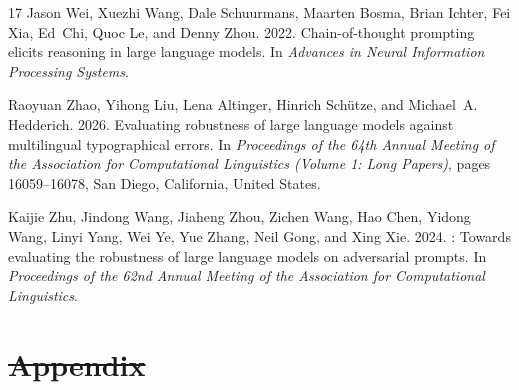 \documentclass[11pt]{article} %
\makeatletter
\providecommand{\DIFdel}[1]{{\protect\color{red}\sout{#1}}} %
\providecommand{\DIFaddbegin}{} %
\providecommand{\DIFaddend}{} %
\providecommand{\DIFdelbegin}{} %
\providecommand{\DIFdelend}{} %
\providecommand{\DIFscaledelfig}{0.5}
\newlength{\DIFdelgraphicswidth} %
\newlength{\DIFdelgraphicsheight} %
\providecommand{\DIFaddincludegraphics}[2][]{{\color{blue}\fbox{\DIFOincludegraphics[#1]{#2}}}} %
\providecommand{\DIFdelincludegraphics}[2][]{%
\sbox{\DIFdelgraphicsbox}{\DIFOincludegraphics[#1]{#2}}%
\settoboxwidth{\DIFdelgraphicswidth}{\DIFdelgraphicsbox} %
\settoboxtotalheight{\DIFdelgraphicsheight}{\DIFdelgraphicsbox} %
\scalebox{\DIFscaledelfig}{%
\parbox[b]{\DIFdelgraphicswidth}{\usebox{\DIFdelgraphicsbox}\\[-\baselineskip] \rule{\DIFdelgraphicswidth}{0em}}\llap{\resizebox{\DIFdelgraphicswidth}{\DIFdelgraphicsheight}{%
\setlength{\unitlength}{\DIFdelgraphicswidth}%
\begin{picture}(1,1)%
\thicklines\linethickness{2pt} %
{\color[rgb]{1,0,0}\put(0,0){\framebox(1,1){}}}%
{\color[rgb]{1,0,0}\put(0,0){\line( 1,1){1}}}%
{\color[rgb]{1,0,0}\put(0,1){\line(1,-1){1}}}%
\end{picture}%
}\hspace*{3pt}}} %
} %
\DeclareRobustCommand{\DIFaddbegin}{\DIFOaddbegin \let\includegraphics\DIFaddincludegraphics} %
\DeclareRobustCommand{\DIFaddend}{\DIFOaddend \let\includegraphics\DIFOincludegraphics} %
\DeclareRobustCommand{\DIFdelbegin}{\DIFOdelbegin \let\includegraphics\DIFdelincludegraphics} %
\DeclareRobustCommand{\DIFdelend}{\DIFOaddend \let\includegraphics\DIFOincludegraphics} %
\let\sout@orig\sout %
\renewcommand{\sout}[1]{\ifmmode\text{\sout@orig{\ensuremath{#1}}}\else\sout@orig{#1}\fi} %
\providecommand{\DIFaddB}[1]{{\protect\color{blue}\uwave{#1}}}
\makeatother
\begin{document}
\begin{thebibliography}{17}
Jason Wei, Xuezhi Wang, Dale Schuurmans, Maarten Bosma, Brian Ichter, Fei Xia,
  Ed~Chi, Quoc Le, and Denny Zhou. 2022.
\newblock Chain-of-thought prompting elicits reasoning in large language
  models.
\newblock In \emph{Advances in Neural Information Processing Systems}.

Raoyuan Zhao, Yihong Liu, Lena Altinger, Hinrich Sch{\"u}tze, and Michael~A.
  Hedderich. 2026.
\newblock Evaluating robustness of large language models against multilingual
  typographical errors.
\newblock In \emph{Proceedings of the 64th Annual Meeting of the Association
  for Computational Linguistics (Volume 1: Long Papers)}, pages 16059--16078,
  San Diego, California, United States.

Kaijie Zhu, Jindong Wang, Jiaheng Zhou, Zichen Wang, Hao Chen, Yidong Wang,
  Linyi Yang, Wei Ye, Yue Zhang, Neil Gong, and Xing Xie. 2024.
: Towards evaluating the robustness of large language
  models on adversarial prompts.
\newblock In \emph{Proceedings of the 62nd Annual Meeting of the Association
  for Computational Linguistics}.

\end{thebibliography}


\DIFdelbegin %
\DIFdelend \clearpage
\onecolumn
\DIFdelbegin %
\section*{\DIFdel{Appendix}}
\DIFdelend %
\DIFaddbegin \appendix
\DIFaddend 

\DIFaddbegin \section{\DIFaddB{Full accuracy grid}}
\label{app:grid}
\DIFaddend 
\end{document}
